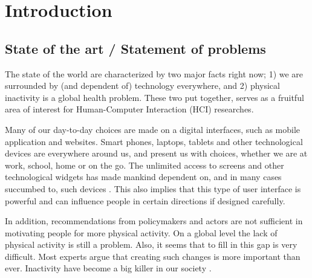 \chapter{Introduction} 


\section{State of the art / Statement of problems}

The state of the world are characterized by two major facts right now; 1) we are surrounded by (and dependent of) technology everywhere, and 2) physical inactivity is a global health problem. These two put together, serves as a fruitful area of interest for Human-Computer Interaction (HCI) researches. 

Many of our day-to-day choices are made on a digital interfaces, such as mobile application and websites. Smart phones, laptops, tablets and other technological devices are everywhere around us, and present us with choices, whether we are at work, school, home or on the go. The unlimited access to screens and other technological widgets has made mankind dependent on, and in many cases succumbed to, such devices \cite{mirsch_digital_2017}.
This also implies that this type of user interface is powerful and can influence people in certain directions if designed carefully. 

In addition, recommendations from policymakers and actors are not sufficient in motivating people for more physical activity. On a global level the lack of physical activity is still a problem. Also, it seems that to fill in this gap is very difficult. Most experts argue that creating such changes is more important than ever. Inactivity have become a big killer in our society \cite{kohl_pandemic_2012}.

